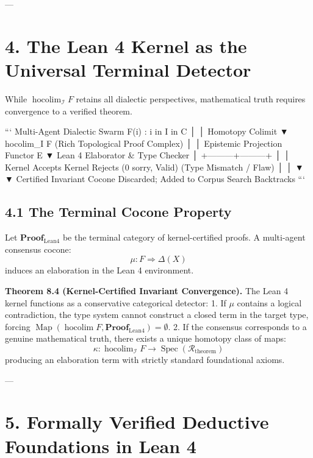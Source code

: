 \documentclass[11pt,twoside,openright]{amsbook}
\begin{document}
{{---

\section{4. The Lean 4 Kernel as the Universal Terminal Detector}

While $\operatorname{hocolim}_{\mathcal{I}} F$ retains all dialectic perspectives, mathematical truth requires convergence to a verified theorem.

```
       Multi-Agent Dialectic Swarm
        { F(i) : i in I } in C
                  │
                  │  Homotopy Colimit
                  ▼
          hocolim_{I} F  (Rich Topological Proof Complex)
                  │
                  │  Epistemic Projection Functor E
                  ▼
       Lean 4 Elaborator & Type Checker
                  │
        +---------+---------+
        │                   │
   Kernel Accepts      Kernel Rejects
   (0 sorry, Valid)    (Type Mismatch / Flaw)
        │                   │
        ▼                   ▼
   Certified Invariant    Cocone Discarded;
   Added to Corpus        Search Backtracks
```

\subsection{4.1 The Terminal Cocone Property}
Let $\mathbf{Proof}_{\text{Lean4}}$ be the terminal category of kernel-certified proofs. A multi-agent consensus cocone:
$$\mu: F \Longrightarrow \Delta(X)$$
induces an elaboration in the Lean 4 environment. 

\textbf{Theorem 8.4 (Kernel-Certified Invariant Convergence).} The Lean 4 kernel functions as a conservative categorical detector:
1. If $\mu$ contains a logical contradiction, the type system cannot construct a closed term in the target type, forcing $\operatorname{Map}(\operatorname{hocolim} F, \mathbf{Proof}_{\text{Lean4}}) = \emptyset$.
2. If the consensus corresponds to a genuine mathematical truth, there exists a unique homotopy class of maps:
   $$\kappa: \operatorname{hocolim}_{\mathcal{I}} F \longrightarrow \operatorname{Spec}(\mathcal{R}_{\text{theorem}})$$
   producing an elaboration term with strictly standard foundational axioms.

---

\section{5. Formally Verified Deductive Foundations in Lean 4}

}}
\end{document}
